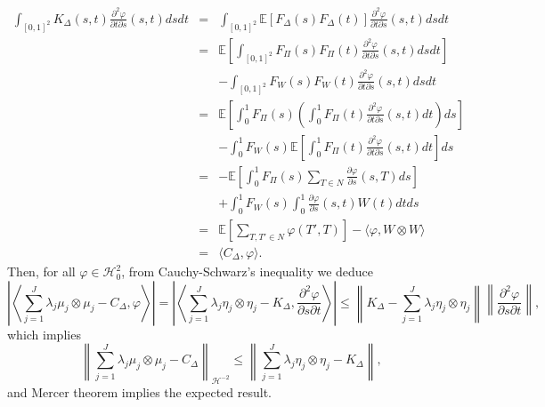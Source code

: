 \documentclass[aos]{imsart}
\theoremstyle{plain}
\theoremstyle{remark}
\newcommand{\1}{1}
\begin{document}
\begin{eqnarray*}
\int_{[0,1]^2}K_\Delta(s,t) \frac{\partial^2 \varphi}{\partial t\partial s}(s,t)dsdt &=& \int_{[0,1]^2}\mathbb E[F_\Delta(s)F_\Delta(t) ]\frac{\partial^2 \varphi}{\partial t\partial s}(s,t)dsdt\\
&=&\mathbb E\left[\int_{[0,1]^2}F_\Pi(s)F_\Pi(t)\frac{\partial^2 \varphi}{\partial t\partial s}(s,t)dsdt\right]\\
&&-\int_{[0,1]^2}F_W(s)F_W(t)\frac{\partial^2 \varphi}{\partial t\partial s}(s,t)dsdt\\
&=&\mathbb E\left[\int_0^1F_\Pi(s)\left(\int_0^1F_\Pi(t)\frac{\partial^2 \varphi}{\partial t\partial s}(s,t)dt\right)ds\right]\\
&&-\int_0^1F_W(s)\mathbb E\left[\int_0^1F_\Pi(t)\frac{\partial^2 \varphi}{\partial t\partial s}(s,t)dt\right]ds\\
&=&-\mathbb E\left[\int_0^1F_\Pi(s)\sum_{T\in N}\frac{\partial \varphi}{\partial s}(s,T)ds\right]\\
&&+\int_0^1F_W(s)\int_0^1\frac{\partial \varphi}{\partial s}(s,t)W(t)dtds\\
&=&\mathbb E\left[\sum_{T,T'\in N}\varphi(T',T)\right]-\langle \varphi,W\otimes W\rangle\\
&=&\langle C_\Delta,\varphi\rangle. 
\end{eqnarray*}
Then, for all $\varphi\in\mathcal H_0^2$, from Cauchy-Schwarz's inequality we deduce 
\[
\left|\left\langle\sum_{j=1}^J\lambda_j\mu_j\otimes\mu_j-C_\Delta,\varphi\right\rangle\right| = \left|\left\langle \sum_{j=1}^J\lambda_j\eta_j\otimes\eta_j-K_\Delta,\frac{\partial^2\varphi}{\partial s\partial t}\right\rangle \right|\leq \left\|K_\Delta-\sum_{j=1}^J\lambda_j\eta_j\otimes\eta_j\right\|\left\|\frac{\partial^2\varphi}{\partial s\partial t}\right\|,
\]
which implies
\[
\left\|\sum_{j=1}^J\lambda_j\mu_j\otimes\mu_j-C_\Delta\right\|_{\mathcal H^{-2}}\leq \left\|\sum_{j=1}^J\lambda_j\eta_j\otimes\eta_j-K_\Delta\right\|, 
\]
and Mercer theorem implies the expected result. 
\end{document}
